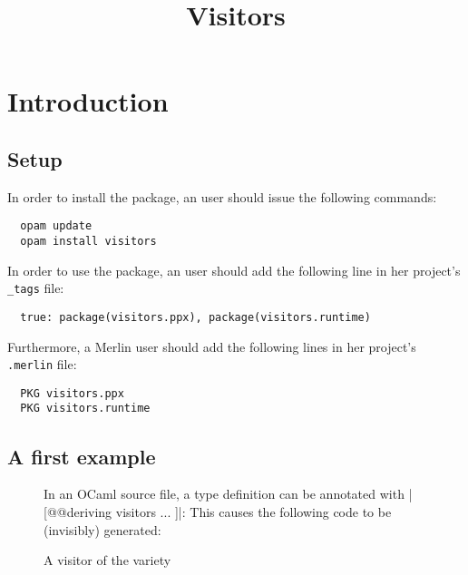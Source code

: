 \documentclass[onecolumn,11pt,nocopyrightspace]{sigplanconf}
\title{Visitors}
\begin{document}
\maketitle


\clearpage


\section{Introduction}

\subsection{Setup}

In order to install the \visitors package, an \opam user should issue the
following commands:
\begin{verbatim}
  opam update
  opam install visitors
\end{verbatim}
In order to use the \visitors package, an \ocamlbuild user should add the
following line in her project's \texttt{\_tags} file:
\begin{lstlisting}
  true: package(visitors.ppx), package(visitors.runtime)
\end{lstlisting}
Furthermore, a Merlin user should add the following lines in her project's
\texttt{.merlin} file:
\begin{lstlisting}
  PKG visitors.ppx
  PKG visitors.runtime
\end{lstlisting}


\subsection{A first example}

\begin{figure}[t]
In an OCaml source file, a type definition can be annotated with
\oc|[@@deriving visitors { ... }]|:
This causes the following code to be (invisibly) generated:
\caption{A visitor of the \iter variety}
\label{fig:expr00}
\end{figure}
\end{document}
